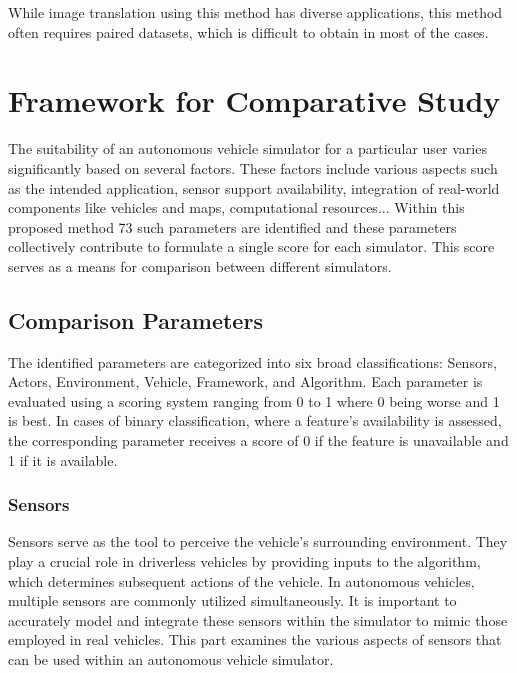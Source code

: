\documentclass[12pt,twoside,a4paper,parskip]{scrbook} %
\begin{document}
While image translation using this method has diverse applications, this method often requires paired datasets, which is difficult to obtain in most of the cases.
\chapter{Framework for Comparative Study}
The suitability of an autonomous vehicle simulator for a particular user varies significantly based on several factors. These factors include various aspects such as the intended application, sensor support availability, integration of real-world components like vehicles and maps, computational resources... Within this proposed method 73 such parameters are identified and these parameters collectively contribute to formulate a single score for each simulator. This score serves as a means for comparison between different simulators. 
\section{Comparison Parameters}
The identified parameters are categorized into six broad classifications: Sensors, Actors, Environment, Vehicle, Framework, and Algorithm. Each parameter is evaluated using a scoring system ranging from 0 to 1 where 0 being worse and 1 is best. In cases of binary classification, where a feature's availability is assessed, the corresponding parameter receives a score of 0 if the feature is unavailable and 1 if it is available.
\subsection{Sensors}
Sensors serve as the tool to perceive the vehicle's surrounding environment. They play a crucial role in driverless vehicles by providing inputs to the algorithm, which determines subsequent actions of the vehicle. In autonomous vehicles, multiple sensors are commonly utilized simultaneously. It is important to accurately model and integrate these sensors within the simulator to mimic those employed in real vehicles. This part examines the various aspects of sensors that can be used within an autonomous vehicle simulator.
\end{document}
